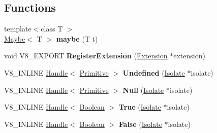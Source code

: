 \subsection*{Functions}
\begin{DoxyCompactItemize}
\item 
\hypertarget{namespacev8_a92c0733af0c413cee85e20b983bb2a5b}{}{\footnotesize template$<$class T $>$ }\\\hyperlink{structv8_1_1Maybe}{Maybe}$<$ T $>$ {\bfseries maybe} (T t)\label{namespacev8_a92c0733af0c413cee85e20b983bb2a5b}

\item 
\hypertarget{namespacev8_a50b91e1100a42cc12e7295b22d44d9d0}{}void V8\+\_\+\+E\+X\+P\+O\+R\+T {\bfseries Register\+Extension} (\hyperlink{classv8_1_1Extension}{Extension} $\ast$extension)\label{namespacev8_a50b91e1100a42cc12e7295b22d44d9d0}

\item 
\hypertarget{namespacev8_af7d2f7fc42d6873af561b885151168d7}{}V8\+\_\+\+I\+N\+L\+I\+N\+E \hyperlink{classv8_1_1Handle}{Handle}$<$ \hyperlink{classv8_1_1Primitive}{Primitive} $>$ {\bfseries Undefined} (\hyperlink{classv8_1_1Isolate}{Isolate} $\ast$isolate)\label{namespacev8_af7d2f7fc42d6873af561b885151168d7}

\item 
\hypertarget{namespacev8_ad3e6b3f6b548745a461b71f3bfb17ef1}{}V8\+\_\+\+I\+N\+L\+I\+N\+E \hyperlink{classv8_1_1Handle}{Handle}$<$ \hyperlink{classv8_1_1Primitive}{Primitive} $>$ {\bfseries Null} (\hyperlink{classv8_1_1Isolate}{Isolate} $\ast$isolate)\label{namespacev8_ad3e6b3f6b548745a461b71f3bfb17ef1}

\item 
\hypertarget{namespacev8_acbc2c4a2a277e913ae100014559f6030}{}V8\+\_\+\+I\+N\+L\+I\+N\+E \hyperlink{classv8_1_1Handle}{Handle}$<$ \hyperlink{classv8_1_1Boolean}{Boolean} $>$ {\bfseries True} (\hyperlink{classv8_1_1Isolate}{Isolate} $\ast$isolate)\label{namespacev8_acbc2c4a2a277e913ae100014559f6030}

\item 
\hypertarget{namespacev8_aa2d11aede58f5b3b0c2abe92f9c8ee40}{}V8\+\_\+\+I\+N\+L\+I\+N\+E \hyperlink{classv8_1_1Handle}{Handle}$<$ \hyperlink{classv8_1_1Boolean}{Boolean} $>$ {\bfseries False} (\hyperlink{classv8_1_1Isolate}{Isolate} $\ast$isolate)\label{namespacev8_aa2d11aede58f5b3b0c2abe92f9c8ee40}

\end{DoxyCompactItemize}


